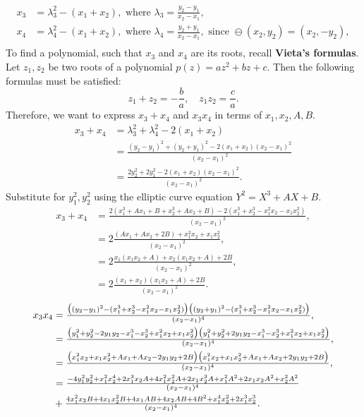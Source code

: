 \documentclass[thesis=M,english]{FITthesis}[2012/10/20]
\theoremstyle{remark}
\theoremstyle{definition}
\begin{document}
\begin{align*}
x_3 &= \lambda_3^2 - (x_1 + x_2), \text{ where } \lambda_3 = \frac{y_2 - y_1}{x_2 - x_1},\\ 
x_4 &= \lambda_4^2 - (x_1 + x_2), \text{ where } \lambda_4 = \frac{y_2 + y_1}{x_2 - x_1}, \text{ since } \ominus (x_2,y_2) = (x_2, -y_2),\\ 
\end{align*}
To find a polynomial, such that $x_3$ and $x_4$ are its roots, recall \textbf{Vieta's formulas}. Let $z_1, z_2$ be two roots of a polynomial $p(z) = az^2 + bz + c$. Then the following formulas must be satisfied:
$$
z_1 + z_2 = -\frac{b}{a},\quad z_1z_2 = \frac{c}{a}.
$$
Therefore, we want to express $x_3 + x_4$ and $x_3 x_4$ in terms of $x_1,x_2,A,B$.
\begin{align*}
x_3 + x_4 &= \lambda_3^2 + \lambda_4^2 - 2(x_1+x_2) \\
&= \frac{(y_2-y_1)^2 + (y_2+y_1)^2 -2(x_1+x_2)(x_2-x_1)^2}{(x_2-x_1)^2} \\
&= \frac{2y_2^2+2y_1^2 -2(x_1+x_2)(x_2-x_1)^2}{(x_2-x_1)^2}.
\end{align*}
Substitute for $y_1^2,y_2^2$ using the elliptic curve equation $Y^2 = X^3 + AX + B.$
 \begin{align*}
x_3 + x_4 &= \frac{2(x_1^3+Ax_1+B+x_2^3+Ax_2+B) -2(x_1^3+x_2^3-x_1^2x_2-x_1x_2^2)}{(x_2-x_1)^2},\\
&= 2\frac{(Ax_1+Ax_2+2B) +x_1^2x_2+x_1x_2^2}{(x_2-x_1)^2}, \\
&= 2\frac{x_1(x_1x_2 + A) + x_2(x_1x_2 + A)+2B}{(x_2-x_1)^2},\\ 
&= 2\frac{(x_1 + x_2)(x_1x_2 + A)+2B}{(x_2-x_1)^2}.
\end{align*}
\vphantom{.}
\begin{align*}
\mathsmaller{x_3x_4} &= \mathsmaller{\frac{\big((y_2-y_1)^2 -(x_1^3+x_2^3-x_1^2x_2-x_1x_2^2)\big)\big((y_2+y_1)^2-(x_1^3+x_2^3-x_1^2x_2-x_1x_2^2)\big)}{(x_2-x_1)^4}}, \\
&= \mathsmaller{\frac{\big(y_1^2 + y_2^2 -2y_1y_2 -x_1^3-x_2^3+x_1^2x_2+x_1x_2^2\big)\big(y_1^2 + y_2^2 +2y_1y_2 -x_1^3-x_2^3+x_1^2x_2+x_1x_2^2\big)}{(x_2-x_1)^4}},\\
&= \mathsmaller{\frac{\big(x_1^2x_2 + x_1x_2^2 + Ax_1 + Ax_2 - 2y_1y_2 + 2B\big)\big(x_1^2x_2 + x_1x_2^2 + Ax_1 + Ax_2 + 2y_1y_2 + 2B\big)}{(x_2-x_1)^4}},\\
&= \mathsmaller{\frac{- 4 y_{1}^{2} y_{2}^{2} + x_{1}^{2} x_{2}^{4} + 2 x_{1}^{3} x_{2} A + 4 x_{1}^{2} x_{2}^{2} A + 2 x_{1} x_{2}^{3} A + x_{1}^{2} A^{2} + 2 x_{1} x_{2} A^{2} + x_{2}^{2} A^{2}}{(x_2-x_1)^4}} \\
&+\mathsmaller{ \frac{4 x_{1}^{2} x_{2} B + 4 x_{1} x_{2}^{2} B + 4 x_{1} A B + 4 x_{2} A B + 4 B^{2} + x_{1}^{4} x_{2}^{2} + 2 x_{1}^{3} x_{2}^{3}}{(x_2-x_1)^4}}.
\end{align*}
\end{document}
